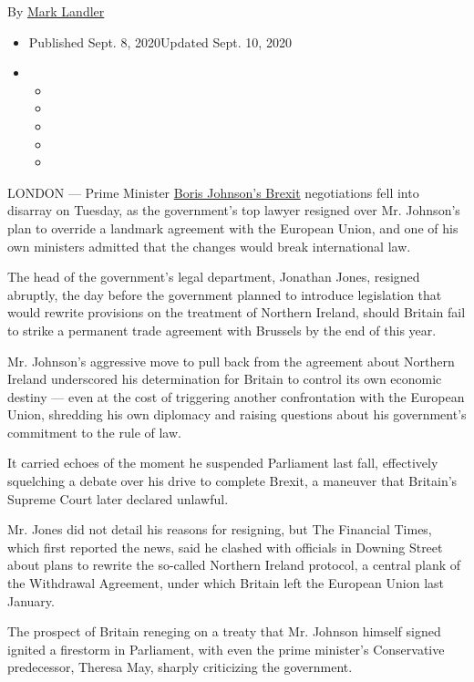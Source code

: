 By \href{https://www.nytimes3xbfgragh.onion/by/mark-landler}{Mark
Landler}

\begin{itemize}
\item
  Published Sept. 8, 2020Updated Sept. 10, 2020
\item
  \begin{itemize}
  \item
  \item
  \item
  \item
  \item
  \end{itemize}
\end{itemize}

LONDON --- Prime Minister
\href{https://www.nytimes3xbfgragh.onion/2020/09/10/world/europe/brexit-boris-johnson-ireland.html}{Boris
Johnson's Brexit} negotiations fell into disarray on Tuesday, as the
government's top lawyer resigned over Mr. Johnson's plan to override a
landmark agreement with the European Union, and one of his own ministers
admitted that the changes would break international law.

The head of the government's legal department, Jonathan Jones, resigned
abruptly, the day before the government planned to introduce legislation
that would rewrite provisions on the treatment of Northern Ireland,
should Britain fail to strike a permanent trade agreement with Brussels
by the end of this year.

Mr. Johnson's aggressive move to pull back from the agreement about
Northern Ireland underscored his determination for Britain to control
its own economic destiny --- even at the cost of triggering another
confrontation with the European Union, shredding his own diplomacy and
raising questions about his government's commitment to the rule of law.

It carried echoes of the moment he suspended Parliament last fall,
effectively squelching a debate over his drive to complete Brexit, a
maneuver that Britain's Supreme Court later declared unlawful.

Mr. Jones did not detail his reasons for resigning, but The Financial
Times, which first reported the news, said he clashed with officials in
Downing Street about plans to rewrite the so-called Northern Ireland
protocol, a central plank of the Withdrawal Agreement, under which
Britain left the European Union last January.

The prospect of Britain reneging on a treaty that Mr. Johnson himself
signed ignited a firestorm in Parliament, with even the prime minister's
Conservative predecessor, Theresa May, sharply criticizing the
government.

